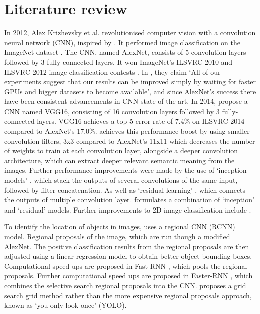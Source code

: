 \documentclass[11pt]{article}
\begin{document}
\section{Literature review}
In 2012, Alex Krizhevsky et al. revolutionised computer vision with a convolution neural network (CNN), inspired by \cite{Yann}. It performed image classification on the ImageNet dataset \cite{ILSVRC15}. The CNN, named AlexNet, consists of 5 convolution layers followed by 3 fully-connected layers. It won ImageNet's ILSVRC-2010 and ILSVRC-2012 image classification contests \cite{alex_net}. In \cite{alex_net}, they claim `All of our experiments suggest that our results can be improved simply by waiting for faster GPUs and bigger datasets to become available', and since AlexNet's success there have been consistent advancements in CNN state of the art. In 2014, \cite{VGG16} propose a CNN named VGG16, consisting of 16 convolution layers followed by 3 fully-connected layers. VGG16 achieves a top-5 error rate of 7.4\% on ILSVRC-2014 compared to AlexNet's 17.0\%. \cite{VGG16} achieves this performance boost by using smaller convolution filters, 3x3 compared to AlexNet's 11x11 which decreases the number of weights to train at each convolution layer, alongside a deeper convolution architecture, which can extract deeper relevant semantic meaning from the images. Further performance improvements were made by the use of `inception models' \cite{inception}\cite{inceptionV2}, which stack the outputs of several convolutions of the same input, followed by filter concatenation. As well as `residual learning' \cite{ResNet}, which connects the outputs of multiple convolution layer. \cite{Incep_ResNet} formulates a combination of `inception' and `residual' models. Further improvements to 2D image classification include \cite{neural_search} \cite{scaleable_image}.

To identify the location of objects in images, \cite{RNN} uses a regional CNN (RCNN) model. Regional proposals of the image, which are run though a modified AlexNet. The positive classification results from the regional proposals are then adjusted using a linear regression model to obtain better object bounding boxes. Computational speed ups are proposed in Fast-RNN \cite{fast_RNN}, which pools the regional proposals. Further computational speed ups are proposed in Faster-RNN \cite{faster_RNN}, which combines the selective search regional proposals into the CNN. \cite{YOLO} proposes a grid search grid method rather than the more expensive regional proposals approach, known as `you only look once' (YOLO).
\end{document}
